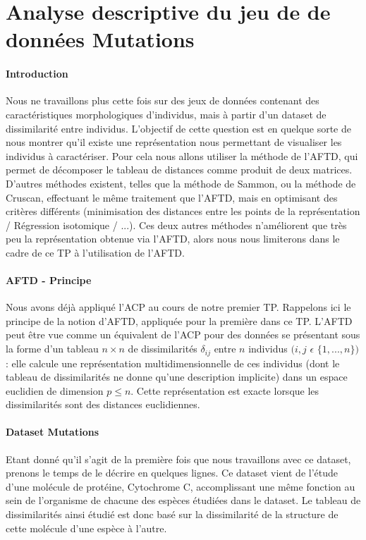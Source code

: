 \documentclass{report}
\begin{document}
\section{Analyse descriptive du jeu de de données Mutations}
\paragraph{Introduction}
Nous ne travaillons plus cette fois sur des jeux de données contenant des caractéristiques morphologiques d'individus, mais à partir d'un dataset de dissimilarité entre individus. L'objectif de cette question est en quelque sorte de nous montrer qu'il existe une représentation nous permettant de visualiser les individus à caractériser. Pour cela nous allons utiliser la méthode de l'AFTD, qui permet de décomposer le tableau de distances comme produit de deux matrices. D'autres méthodes existent, telles que la méthode de Sammon, ou la méthode de Cruscan, effectuant le même traitement que l'AFTD, mais en optimisant des critères différents (minimisation des distances entre les points de la représentation / Régression isotomique / ...). Ces deux autres méthodes n'améliorent que très peu la représentation obtenue via l'AFTD, alors nous nous limiterons dans le cadre de ce TP à l'utilisation de l'AFTD.
\paragraph{AFTD - Principe}
Nous avons déjà appliqué l'ACP au cours de notre premier TP. Rappelons ici le principe de la notion d'AFTD, appliquée pour la première dans ce TP. L'AFTD peut être vue comme un équivalent de l'ACP pour des données se présentant sous la forme d'un tableau $n \times n$ de dissimilarités $\delta_{ij}$ entre $n$ individus $(i,j$ $\epsilon$ $\{1,...,n\})$ : elle calcule une représentation multidimensionnelle de ces individus (dont le tableau de dissimilarités ne donne qu'une description implicite) dans un espace euclidien de dimension $p \le n$. Cette représentation est exacte lorsque les dissimilarités sont des distances euclidiennes.
\paragraph{Dataset Mutations}
Etant donné qu'il s'agit de la première fois que nous travaillons avec ce dataset, prenons le temps de le décrire en quelques lignes. Ce dataset vient de l'étude d'une molécule de protéine, Cytochrome C, accomplissant une même fonction au sein de l'organisme de chacune des espèces étudiées dans le dataset. Le tableau de dissimilarités ainsi étudié est donc basé sur la dissimilarité de la structure de cette molécule d'une espèce à l'autre.
\end{document}
